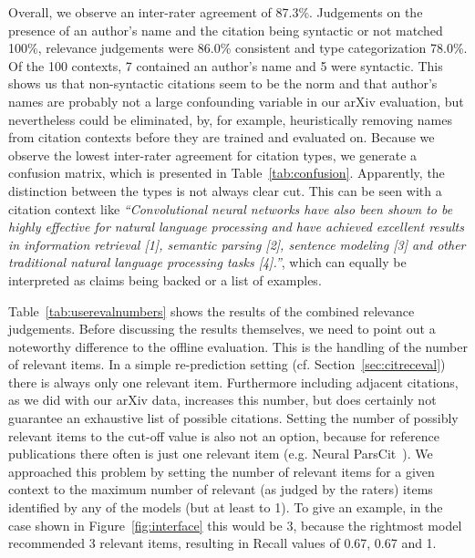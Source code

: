 Overall, we observe an inter-rater agreement of 87.3\%. Judgements on the presence of an author's name and the citation being syntactic or not matched 100\%, relevance judgements were 86.0\% consistent and type categorization 78.0\%. Of the 100 contexts, 7 contained an author's name and 5 were syntactic. This shows us that non-syntactic citations seem to be the norm and that author's names are probably not a large confounding variable in our arXiv evaluation, but nevertheless could be eliminated, by, for example, heuristically removing names from citation contexts before they are trained and evaluated on. Because we observe the lowest inter-rater agreement for citation types, we generate a confusion matrix, which is presented in Table~\ref{tab:confusion}. Apparently, the distinction between the types is not always clear cut. This can be seen with a citation context like \emph{``Convolutional neural networks have also been shown to be highly effective for natural language processing and have achieved excellent results in information retrieval [1], semantic parsing [2], sentence modeling [3] and other traditional natural language processing tasks [4].''}, which can equally be interpreted as claims being backed or a list of examples.

Table~\ref{tab:userevalnumbers} shows the results of the combined relevance judgements. Before discussing the results themselves, we need to point out a noteworthy difference to the offline evaluation. This is the handling of the number of relevant items. In a simple re-prediction setting (cf. Section~\ref{sec:citreceval}) there is always only one relevant item. Furthermore including adjacent citations, as we did with our arXiv data, increases this number, but does certainly not guarantee an exhaustive list of possible citations. Setting the number of possibly relevant items to the cut-off value is also not an option, because for reference publications there often is just one relevant item (e.g. Neural ParsCit~\cite{Animesh2018}). We approached this problem by setting the number of relevant items for a given context to the maximum number of relevant (as judged by the raters) items identified by any of the models (but at least to 1). To give an example, in the case shown in Figure~\ref{fig:interface} this would be 3, because the rightmost model recommended 3 relevant items, resulting in Recall values of 0.67, 0.67 and 1.

